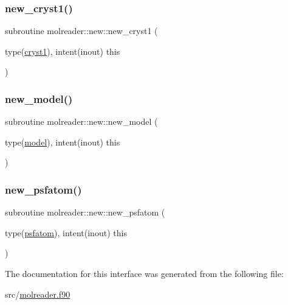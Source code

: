 \subsubsection{\texorpdfstring{new\+\_\+cryst1()}{new\_cryst1()}}
{\footnotesize\ttfamily subroutine molreader\+::new\+::new\+\_\+cryst1 (\begin{DoxyParamCaption}\item[{type(\hyperlink{structmolreader_1_1cryst1}{cryst1}), intent(inout)}]{this }\end{DoxyParamCaption})\hspace{0.3cm}{\ttfamily [private]}}

\mbox{\label{interfacemolreader_1_1new_ac306717f3be718d382c6b9c38ade70bb}} 
\subsubsection{\texorpdfstring{new\+\_\+model()}{new\_model()}}
{\footnotesize\ttfamily subroutine molreader\+::new\+::new\+\_\+model (\begin{DoxyParamCaption}\item[{type(\hyperlink{structmolreader_1_1model}{model}), intent(inout)}]{this }\end{DoxyParamCaption})\hspace{0.3cm}{\ttfamily [private]}}

\mbox{\label{interfacemolreader_1_1new_a61dff60bac414a094a6a1082f3a63296}} 
\subsubsection{\texorpdfstring{new\+\_\+psfatom()}{new\_psfatom()}}
{\footnotesize\ttfamily subroutine molreader\+::new\+::new\+\_\+psfatom (\begin{DoxyParamCaption}\item[{type(\hyperlink{structmolreader_1_1psfatom}{psfatom}), intent(inout)}]{this }\end{DoxyParamCaption})\hspace{0.3cm}{\ttfamily [private]}}



The documentation for this interface was generated from the following file\+:\begin{DoxyCompactItemize}
\item 
src/\hyperlink{molreader_8f90}{molreader.\+f90}\end{DoxyCompactItemize}
